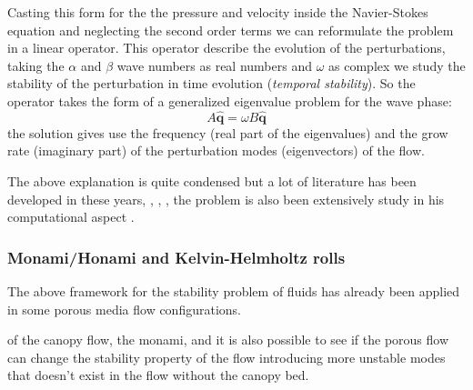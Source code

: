 Casting this form for the the pressure and velocity inside the Navier-Stokes equation and neglecting the second order terms we can reformulate the problem in a linear operator.
This operator describe the evolution of the perturbations, taking the $\alpha$ and $\beta$ wave numbers as real numbers and $\omega$ as complex we study the stability of the perturbation in time evolution (\textit{temporal stability}).
So the operator takes the form of a generalized eigenvalue problem for the wave phase:
$$ A \widehat{\mathbf{q}}=  \omega B\widehat{\mathbf{q}} $$
the solution gives use the frequency (real part of the eigenvalues) and the grow rate (imaginary part) of the perturbation modes (eigenvectors) of the flow.

The above explanation is quite condensed but a lot of literature has been developed in these years, \cite{juniper2014modal}, \cite{criminale2003theory}, \cite{schmid2012stability}, the problem is also been extensively study in his computational aspect \citet{canuto1988spectral}.

\subsubsection{Monami/Honami and Kelvin-Helmholtz rolls}

The above framework for the stability problem of fluids has already been applied in some porous media flow configurations. 

\citet{tilton2008linear}

of the canopy flow, the monami, and it is also possible to see if the porous flow can change the stability property of the flow introducing more unstable modes that doesn't exist in the flow without the canopy bed. 

